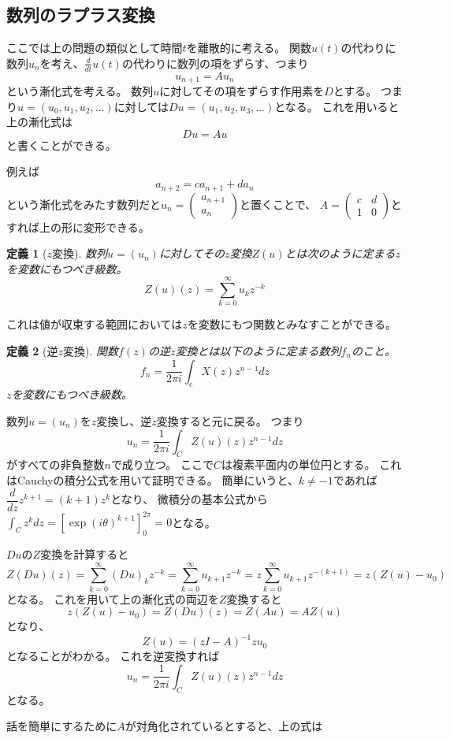 \documentclass{jsarticle}
\newtheorem{dfn}{定義}
\begin{document}
\subsection{数列のラプラス変換}
ここでは上の問題の類似として時間$t$を離散的に考える。
関数$u(t)$の代わりに数列$u_n$を考え、$\frac{d}{dt}u(t)$の代わりに数列の項をずらす、つまり
\[
u_{n+1}=Au_n
\]
という漸化式を考える。
数列$u$に対してその項をずらす作用素を$D$とする。
つまり$u=(u_0,u_1,u_2,\ldots)$に対しては$Du=(u_1,u_2,u_3,\ldots)$となる。
これを用いると上の漸化式は
\[
Du=Au
\]
と書くことができる。

例えば
\[
a_{n+2}=ca_{n+1}+da_n
\]
という漸化式をみたす数列だと$u_n=\begin{pmatrix}a_{n+1}\\a_n\end{pmatrix}$と置くことで、
$A=\begin{pmatrix}c&d\\1&0\end{pmatrix}$とすれば上の形に変形できる。

\begin{dfn}[$z$変換]
数列$u=(u_n)$に対してその$z$変換$Z(u)$とは次のように定まる$z$を変数にもつべき級数。
\[
Z(u)(z)=\sum_{k=0}^\infty u_kz^{-k}
\]
\end{dfn}
これは値が収束する範囲においては$z$を変数にもつ関数とみなすことができる。

\begin{dfn}[逆$z$変換]
関数$f(z)$の逆$z$変換とは以下のように定まる数列$f_n$のこと。
\[
f_n=\frac{1}{2\pi i}\int_cX(z)z^{n-1}dz
\]
$z$を変数にもつべき級数。
\end{dfn}

数列$u=(u_n)$を$z$変換し、逆$z$変換すると元に戻る。
つまり
\[
u_n=\frac{1}{2\pi i}\int_CZ(u)(z)z^{n-1}dz
\]
がすべての非負整数$n$で成り立つ。
ここで$C$は複素平面内の単位円とする。
これはCauchyの積分公式を用いて証明できる。
簡単にいうと、$k\neq-1$であれば$\dfrac{d}{dz}z^{k+1}=(k+1)z^k$となり、
微積分の基本公式から$\int_Cz^kdz=[\exp(i\theta)^{k+1}]^{2\pi}_0=0$となる。

$Du$の$Z$変換を計算すると
\[
Z(Du)(z)=\sum_{k=0}^\infty(Du)_kz^{-k}=\sum^\infty_{k=0}u_{k+1}z^{-k}=z\sum^\infty_{k=0}u_{k+1}z^{-(k+1)}=z(Z(u)-u_0)
\]
となる。
これを用いて上の漸化式の両辺を$Z$変換すると
\[
z(Z(u)-u_0)=Z(Du)(z)=Z(Au)=AZ(u)
\]
となり、
\[
Z(u)=(zI-A)^{-1}zu_0
\]
となることがわかる。
これを逆変換すれば
\[
u_n=\frac{1}{2\pi i}\int_CZ(u)(z)z^{n-1}dz
\]
となる。

話を簡単にするために$A$が対角化されているとすると、上の式は
\end{document}
